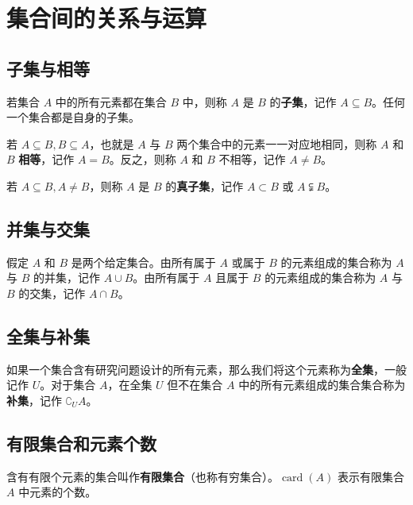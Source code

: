 \section{集合间的关系与运算}

\subsection{子集与相等}

若集合 $A$ 中的所有元素都在集合 $B$ 中，则称 $A$ 是 $B$ 的\textbf{子集}，记作 $A \subseteq B$。任何一个集合都是自身的子集。

若 $A \subseteq B, B \subseteq A$，也就是 $A$ 与 $B$ 两个集合中的元素一一对应地相同，则称 $A$ 和 $B$ \textbf{相等}，记作 $A = B$。反之，则称 $A$ 和 $B$ 不相等，记作 $A \neq B$。

若 $A \subseteq B, A \neq B$，则称 $A$ 是 $B$ 的\textbf{真子集}，记作 $A \subset B$ 或 $A \subsetneqq B$。

\subsection{并集与交集}

假定 $A$ 和 $B$ 是两个给定集合。由所有属于 $A$ 或属于 $B$ 的元素组成的集合称为 $A$ 与 $B$ 的并集，记作 $A \cup B$。由所有属于 $A$ 且属于 $B$ 的元素组成的集合称为 $A$ 与 $B$ 的交集，记作 $A \cap B$。

\subsection{全集与补集}

如果一个集合含有研究问题设计的所有元素，那么我们将这个元素称为\textbf{全集}，一般记作 $U$。对于集合 $A$，在全集 $U$ 但不在集合 $A$ 中的所有元素组成的集合集合称为\textbf{补集}，记作 $ \complement_U A$。

\subsection{有限集合和元素个数}

含有有限个元素的集合叫作\textbf{有限集合}（也称有穷集合）。$\operatorname{card}(A)$ 表示有限集合 $A$ 中元素的个数。